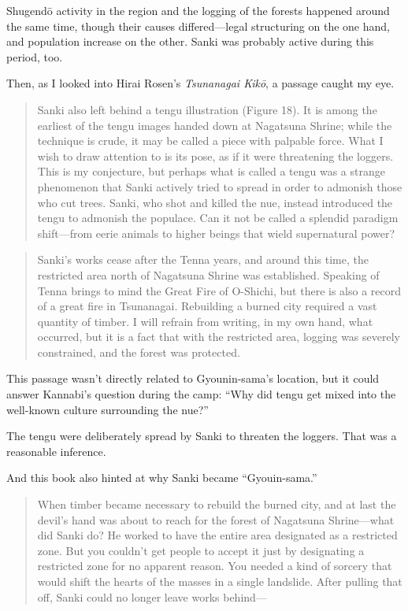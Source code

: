 \documentclass[
    a4paper,
    12pt,
    twoside,
    openany,
    UTF8,
    fontset=windows
]{ctexbook}
\begin{document}
Shugend\=o activity in the region and the logging of the forests happened around the same time, though their causes differed---legal structuring on the one hand, and population increase on the other. Sanki was probably active during this period, too.

Then, as I looked into Hirai Rosen's \textit{Tsunanagai Kik\=o}, a passage caught my eye.

{\bfseries
\begin{quote}
Sanki also left behind a tengu illustration (Figure 18). It is among the earliest of the tengu images handed down at Nagatsuna Shrine; while the technique is crude, it may be called a piece with palpable force. What I wish to draw attention to is its pose, as if it were threatening the loggers. This is my conjecture, but perhaps what is called a tengu was a strange phenomenon that Sanki actively tried to spread in order to admonish those who cut trees. Sanki, who shot and killed the nue, instead introduced the tengu to admonish the populace. Can it not be called a splendid paradigm shift---from eerie animals to higher beings that wield supernatural power?
\end{quote}
}

{\bfseries
\begin{quote}
Sanki's works cease after the Tenna years, and around this time, the restricted area north of Nagatsuna Shrine was established. Speaking of Tenna brings to mind the Great Fire of O-Shichi, but there is also a record of a great fire in Tsunanagai. Rebuilding a burned city required a vast quantity of timber. I will refrain from writing, in my own hand, what occurred, but it is a fact that with the restricted area, logging was severely constrained, and the forest was protected.
\end{quote}
}

This passage wasn't directly related to Gyounin-sama's location, but it could answer Kannabi's question during the camp: ``Why did tengu get mixed into the well-known culture surrounding the nue?''

The tengu were deliberately spread by Sanki to threaten the loggers. That was a reasonable inference.

And this book also hinted at why Sanki became ``Gyouin-sama.''

\begin{quote}
When timber became necessary to rebuild the burned city, and at last the devil's hand was about to reach for the forest of Nagatsuna Shrine---what did Sanki do? He worked to have the entire area designated as a restricted zone. But you couldn't get people to accept it just by designating a restricted zone for no apparent reason. You needed a kind of sorcery that would shift the hearts of the masses in a single landslide. After pulling that off, Sanki could no longer leave works behind---
\end{quote}
\end{document}
